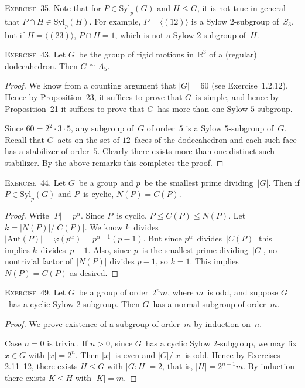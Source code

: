 \documentclass[letterpaper]{article}
\newcommand{\exercise}[1]{\goodbreak\noindent\textsc{Exercise~{#1}.}}
\newcommand{\R}{\mathbb{R}}
\newcommand{\iso}{\cong}
\newcommand{\sect}{\cap}
\newcommand{\subgroup}{\le}
\newcommand{\normal}{\trianglelefteq}
\newcommand{\aut}{\mathrm{Aut}}
\newcommand{\syl}{\mathrm{Syl}}
\newcommand{\ord}[1]{|{#1}|}
\newcommand{\gen}[1]{\langle{#1}\rangle}
\newcommand{\gindex}[2]{|{#1}:{#2}|}
\begin{document}
\bigskip
\exercise{35}
Note that for $P\in\syl_p(G)$ and $H\subgroup G$, it is not true in general that $P\sect H\in\syl_p(H)$. For example, $P=\gen{(12)}$ is a Sylow $2$-subgroup of~$S_3$, but if $H=\gen{(23)}$, $P\sect H=1$, which is not a Sylow $2$-subgroup of~$H$.

\bigskip
\exercise{43}
Let $G$~be the group of rigid motions in~$\R^3$ of a (regular) dodecahedron. Then $G\iso A_5$.
\begin{proof}
We know from a counting argument that $\ord{G}=60$ (see Exercise~1.2.12). Hence by Proposition~23, it suffices to prove that $G$~is simple, and hence by Proposition~21 it suffices to prove that $G$~has more than one Sylow $5$-subgroup.

Since $60=2^2\cdot 3\cdot 5$, any subgroup of~$G$ of order~$5$ is a Sylow $5$-subgroup of~$G$. Recall that $G$~acts on the set of $12$~faces of the dodecahedron and each such face has a stabilizer of order~$5$. Clearly there exists more than one distinct such stabilizer. By the above remarks this completes the proof.
\end{proof}

\exercise{44}
Let $G$~be a group and $p$~be the smallest prime dividing~$\ord{G}$. Then if $P\in\syl_p(G)$ and $P$~is cyclic, $N(P)=C(P)$.
\begin{proof}
Write $\ord{P}=p^{\alpha}$. Since $P$~is cyclic, $P\subgroup C(P)\subgroup N(P)$. Let $k=\ord{N(P)}/\ord{C(P)}$. We know $k$~divides $\ord{\aut(P)}=\varphi(p^{\alpha})=p^{\alpha-1}(p-1)$. But since $p^{\alpha}$~divides~$\ord{C(P)}$ this implies $k$~divides~$p-1$. Also, since $p$~is the smallest prime dividing~$\ord{G}$, no nontrivial factor of~$\ord{N(P)}$ divides $p-1$, so $k=1$. This implies $N(P)=C(P)$ as desired.
\end{proof}

\exercise{49}
Let $G$~be a group of order~$2^n m$, where $m$~is odd, and suppose $G$~has a cyclic Sylow $2$-subgroup. Then $G$~has a normal subgroup of order~$m$.
\begin{proof}
We prove existence of a subgroup of order~$m$ by induction on~$n$.

Case $n=0$ is trivial. If $n>0$, since $G$~has a cyclic Sylow $2$-subgroup, we may fix $x\in G$ with $\ord{x}=2^n$. Then $\ord{x}$~is even and $\ord{G}/\ord{x}$ is odd. Hence by Exercises 2.11--12, there exists $H\subgroup G$ with $\gindex{G}{H}=2$, that is, $\ord{H}=2^{n-1}m$. By induction there exists $K\normal H$ with $\ord{K}=m$.
\end{proof}
\end{document}
